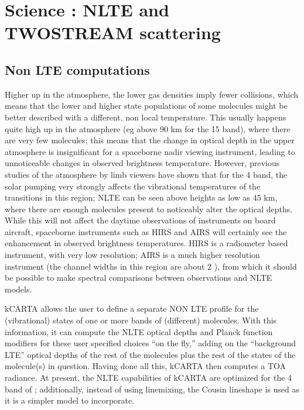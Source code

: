 \documentclass[12pt]{article}
\newcommand{\kc}{\textsf{kCARTA}\xspace}
\begin{document}
{{{{\section{Science : NLTE and TWOSTREAM scattering}
\subsection{Non LTE computations}
Higher up in the atmosphere, the lower gas densities imply fewer collisions, 
which means that the lower and higher state populations of some molecules 
might be better described with a different, non local temperature. This 
usually happens quite high up in the atmosphere (eg above 90 km for the 15 \um
\cd band), where there are very few molecules; this means that the change in 
optical depth in the upper atmosphere is insignificant for a spaceborne 
nadir viewing instrument, leading to unnoticeable changes in observed 
brightness temperature. However, previous studies of the atmosphere by limb 
viewers have shown that for the 4 \um \cd band, the solar pumping very strongly
affects the vibrational temperatures of the transitions in this region; NLTE
can be seen above heights as low as 45 km, where there are enough molecules
present to noticeably alter the optical depths. While this will not affect the 
daytime observations of instruments on board aircraft, spaceborne instruments
such as HIRS and AIRS will certainly see the enhancement in observed brightness
temperatures. HIRS is a radiometer based instrument, with very low resolution;
AIRS is a much higher resolution instrument (the channel widths in this region
are about 2 \wn), from which it should be possible to make spectral 
comparisons between observations and NLTE models.

\kc allows the user to define a separate NON LTE profile for the (vibrational) 
states of one or more bands of (different) molecules. With this information, 
it can compute the NLTE optical depths and Planck function modifiers for 
these user specified choices ``on the fly,'' adding on the ``background LTE'' 
optical depths of the rest of the molecules plus the rest of the states of 
the molecule(s) in question. Having done all this, \kc then computes a 
TOA radiance. At present, the NLTE capabilities of \kc are optimized for the 
4 \um band of \cd; additionally, instead of using linemixing, the Cousin 
lineshape is used as it is a simpler model to incorporate.

}}}}
\end{document}
